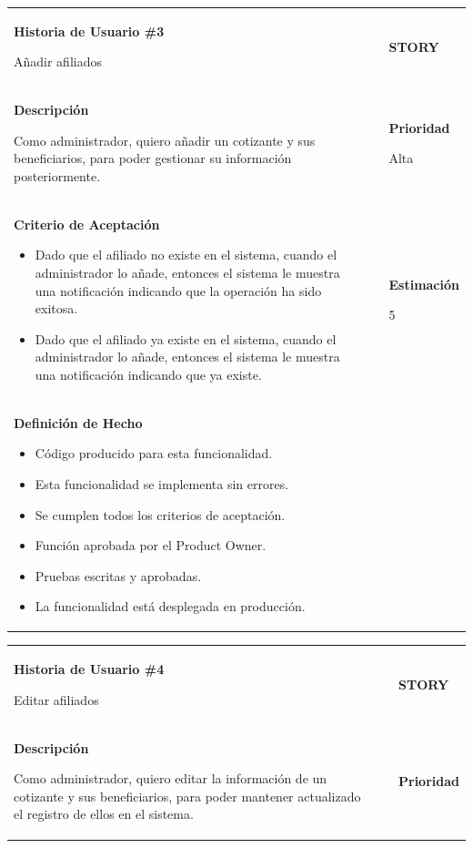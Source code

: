 \documentclass[12pt,a4paper]{article}
\begin{document}
\begin{center}
\begin{tabular}{| p{10cm} c p{2.5cm}|}
\hline 
\textbf{Historia de Usuario \#3}

Añadir afiliados & & \textbf{{\Large STORY}} \\ 
\textbf{Descripción}

Como administrador, quiero añadir un cotizante y sus beneficiarios, para
poder gestionar su información posteriormente. &  & \textbf{Prioridad}

Alta\\

\textbf{Criterio de Aceptación}

\begin{itemize}
\item Dado que el afiliado no existe en el sistema, cuando el
administrador lo añade, entonces el sistema le muestra una
notificación indicando que la operación ha sido exitosa.
\item Dado que el afiliado ya existe en el sistema,
cuando el administrador lo añade, entonces el sistema le
muestra una notificación indicando que ya existe.
\end{itemize} & & \textbf{Estimación}

5 \\ 

\textbf{Definición de Hecho}

\begin{itemize}
\item Código producido para esta funcionalidad.
\item Esta funcionalidad se implementa sin errores.
\item Se cumplen todos los criterios de aceptación.
\item Función aprobada por el Product Owner.
\item Pruebas escritas y aprobadas.
\item La funcionalidad está desplegada en producción.
\end{itemize} & & \\
\hline  
\end{tabular}
\vspace{5mm}

\begin{tabular}{| p{10cm} c p{2.5cm}|}
\hline 
\textbf{Historia de Usuario \#4}

Editar afiliados & & \textbf{{\Large STORY}} \\ 
\textbf{Descripción}

Como administrador, quiero editar la información de un cotizante y sus
beneficiarios, para poder mantener actualizado el registro de ellos en el
sistema. &  & \textbf{Prioridad}


\end{tabular}
\end{center}
\end{document}
